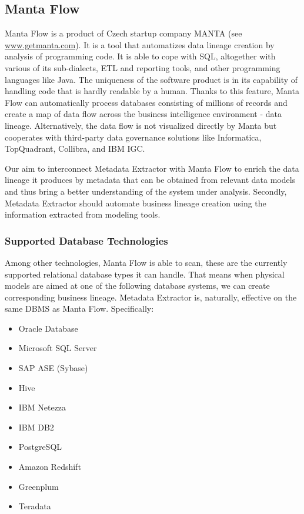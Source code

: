 \subsection{Manta Flow}

Manta Flow is a product of Czech startup company MANTA (see \url{www.getmanta.com}). It is a tool that automatizes data lineage creation by analysis of programming code. It is able to cope with SQL, altogether with various of its sub-dialects, ETL and reporting tools, and other programming languages like Java. 
The uniqueness of the software product is in its capability of handling code that is hardly readable by a human. Thanks to this feature, Manta Flow can automatically process databases consisting of millions of records and create a map of data flow across the business intelligence environment - data lineage.
Alternatively, the data flow is not visualized directly by Manta but cooperates with third-party data governance solutions like Informatica, TopQuadrant, Collibra, and IBM IGC.

Our aim to interconnect Metadata Extractor with Manta Flow to enrich the data lineage it produces by metadata that can be obtained from relevant data models and thus bring a better understanding of the system under analysis. 
Secondly, Metadata Extractor should automate business lineage creation using the information extracted from modeling tools.

\subsubsection{Supported Database Technologies}
Among other technologies, Manta Flow is able to scan, these are the currently supported relational database types it can handle. 
That means when physical models are aimed at one of the following database systems, we can create corresponding business lineage. Metadata Extractor is, naturally, effective on the same DBMS as Manta Flow. Specifically:
\begin{itemize}
	\item Oracle Database
	\item Microsoft SQL Server
	\item SAP ASE (Sybase)
	\item Hive
	\item IBM Netezza
	\item IBM DB2
	\item PostgreSQL
	\item Amazon Redshift
	\item Greenplum
	\item Teradata
\end{itemize}

